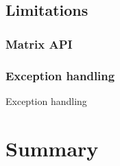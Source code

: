 




\subsection{Limitations}

\subsubsection{Matrix API}


\subsubsection{Exception handling}
Exception handling



 
 

\section{Summary}